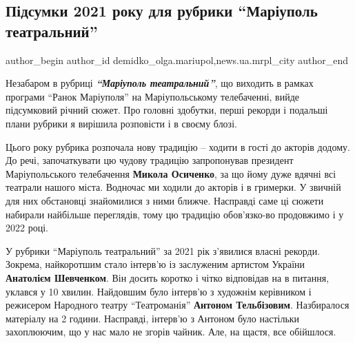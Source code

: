  
 
 
 
 
 
\subsection{Підсумки 2021 року для рубрики \enquote{Маріуполь театральний}}
\label{sec:30_12_2021.stz.news.ua.mrpl_city.1.pidsumky_2021_rubrika_mrpl_teatralnyj}
 
\ifcmt
 author_begin
   author_id demidko_olga.mariupol,news.ua.mrpl_city
 author_end
\fi


Незабаром в рубриці \emph{\textbf{\enquote{Маріуполь театральний}}}, що виходить в рамках програми
\enquote{Ранок Маріуполя} на Маріупольському телебаченні, вийде підсумковий річний
сюжет. Про головні здобутки, перші рекорди і подальші плани рубрики я вирішила
розповісти і в своєму блозі.

Цього року рубрика розпочала нову традицію – ходити в гості до акторів додому.
До речі, започаткувати цю чудову традицію запропонував президент
Маріупольського телебачення \textbf{Микола Осиченко}, за що йому дуже вдячні всі
театрали нашого міста. Водночас ми ходили до акторів  і в гримерки. У звичній
для них обстановці знайомилися з ними ближче. Насправді саме ці сюжети набирали
найбільше переглядів, тому цю традицію обов'язко\hyp{}во продовжимо і у 2022 році.


У рубрики \enquote{Маріуполь театральний} за 2021 рік з'явилися власні  рекорди.
Зокрема, найкоротшим стало інтерв'ю із заслуженим артистом України \textbf{Анатолієм
Шевченком}. Він досить коротко і чітко відповідав на в питання, уклався у 10
хвилин. Найдовшим було інтерв'ю з художнім керівником і режисером Народного
театру \enquote{Театроманія} \textbf{Антоном Тельбізовим}. Назбиралося матеріалу на 2 години.
Насправді, інтерв'ю з Антоном було настільки захоплюючим, що у нас мало не
згорів чайник. Але, на щастя, все обійшлося.

